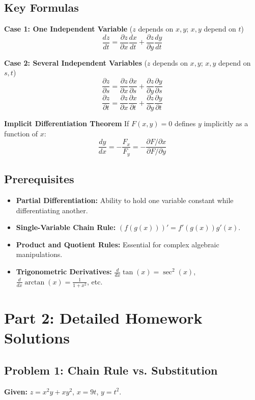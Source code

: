 \documentclass[11pt, letterpaper]{article}
\theoremstyle{definition}
\begin{document}
\subsection{Key Formulas}

\textbf{Case 1: One Independent Variable} ($z$ depends on $x,y$; $x,y$ depend on $t$)
\[ \frac{dz}{dt} = \frac{\partial z}{\partial x}\frac{dx}{dt} + \frac{\partial z}{\partial y}\frac{dy}{dt} \]

\textbf{Case 2: Several Independent Variables} ($z$ depends on $x,y$; $x,y$ depend on $s,t$)
\[ \frac{\partial z}{\partial s} = \frac{\partial z}{\partial x}\frac{\partial x}{\partial s} + \frac{\partial z}{\partial y}\frac{\partial y}{\partial s} \]
\[ \frac{\partial z}{\partial t} = \frac{\partial z}{\partial x}\frac{\partial x}{\partial t} + \frac{\partial z}{\partial y}\frac{\partial y}{\partial t} \]

\textbf{Implicit Differentiation Theorem}
If $F(x, y) = 0$ defines $y$ implicitly as a function of $x$:
\[ \frac{dy}{dx} = -\frac{F_x}{F_y} = -\frac{\partial F / \partial x}{\partial F / \partial y} \]

\subsection{Prerequisites}
\begin{itemize}
    \item \textbf{Partial Differentiation:} Ability to hold one variable constant while differentiating another.
    \item \textbf{Single-Variable Chain Rule:} $(f(g(x)))' = f'(g(x))g'(x)$.
    \item \textbf{Product and Quotient Rules:} Essential for complex algebraic manipulations.
    \item \textbf{Trigonometric Derivatives:} $\frac{d}{dx}\tan(x) = \sec^2(x)$, $\frac{d}{dx}\arctan(x) = \frac{1}{1+x^2}$, etc.
\end{itemize}

\newpage

\section{Part 2: Detailed Homework Solutions}

\subsection*{Problem 1: Chain Rule vs. Substitution}
\textbf{Given:} $z = x^2y + xy^2$, $x = 9t$, $y = t^2$.
\end{document}

